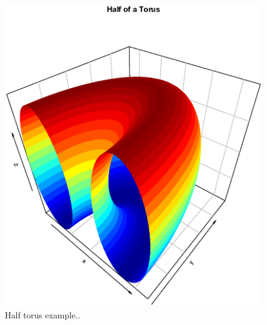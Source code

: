 \documentclass[11pt]{book}\usepackage[]{graphicx}\usepackage[]{color}
\makeatletter
\def\maxwidth{ %
  \ifdim\Gin@nat@width>\linewidth
    \linewidth
  \else
    \Gin@nat@width
  \fi
}
\newenvironment{knitrout}{}{} %
\makeatother
\begin{document}
\begin{figure}[H]
\begin{center}
\begin{knitrout}
\color{fgcolor}
\includegraphics[width=\maxwidth]{knitr-cache/unnamed-chunk-5-1} 

\end{knitrout}
\end{center}
\caption{Half torus example..}
\label{fig:example-half-torus}
\end{figure}
\clearpage
\end{document}
